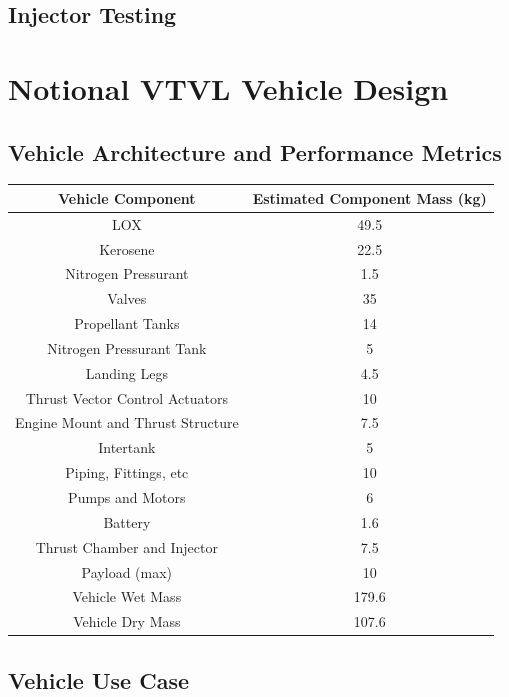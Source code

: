 \documentclass[12pt, letterpaper]{article}
\begin{document}
\subsection{Injector Testing}

\newpage

\section{Notional VTVL Vehicle Design}
\subsection{Vehicle Architecture and Performance Metrics}

\begin{tabular}{|c|c|}

\hline

Vehicle Component & Estimated Component Mass (kg) \\

\hline

LOX & 49.5 \\
Kerosene & 22.5 \\
Nitrogen Pressurant & 1.5 \\
Valves & 35 \\
Propellant Tanks & 14 \\
Nitrogen Pressurant Tank & 5 \\
Landing Legs & 4.5 \\
Thrust Vector Control Actuators & 10 \\
Engine Mount and Thrust Structure & 7.5 \\
Intertank & 5 \\
Piping, Fittings, etc & 10 \\
Pumps and Motors & 6 \\
Battery & 1.6 \\
Thrust Chamber and Injector & 7.5 \\
Payload (max) & 10 \\

\hline

Vehicle Wet Mass & 179.6 \\
Vehicle Dry Mass & 107.6 \\

\hline

\end{tabular}

\subsection{Vehicle Use Case}
\end{document}
